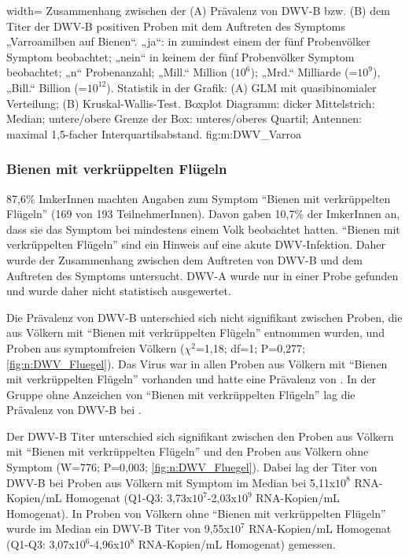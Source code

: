   {width=\textwidth} %
  {Zusammenhang zwischen der (A) Prävalenz von DWV-B bzw. (B) dem Titer der DWV-B positiven Proben mit dem Auftreten des Symptoms „Varroamilben auf Bienen“. „ja“: in zumindest einem der fünf Probenvölker Symptom beobachtet; „nein“ in keinem der fünf Probenvölker Symptom beobachtet; „n“ Probenanzahl; „Mill.“ Million ($10^6$); „Mrd.“ Milliarde (=$10^9$), „Bill.“ Billion (=$10^{12}$). Statistik in der Grafik: (A) GLM mit quasibinomialer Verteilung; (B) Kruskal-Wallis-Test. Boxplot Diagramm: dicker Mittelstrich: Median; untere/obere Grenze der Box: unteres/oberes Quartil; Antennen: maximal 1,5-facher Interquartilsabstand.} %
  {} %
  {fig:m:DWV_Varroa} %

\subsubsection{Bienen mit verkrüppelten Flügeln}

87,6\% ImkerInnen machten Angaben zum Symptom \enquote{Bienen mit verkrüppelten Flügeln} (169 von 193 TeilnehmerInnen). Davon gaben 10,7\% der ImkerInnen an, dass sie das Symptom bei mindestens einem Volk beobachtet hatten. \enquote{Bienen mit verkrüppelten Flügeln} sind ein Hinweis auf eine akute DWV-Infektion. Daher wurde der Zusammenhang zwischen dem Auftreten von DWV-B und dem Auftreten des Symptoms untersucht. DWV-A wurde nur in einer Probe gefunden und wurde daher nicht statistisch ausgewertet.

Die Prävalenz von DWV-B unterschied sich nicht signifikant zwischen Proben, die aus Völkern mit \enquote{Bienen mit verkrüppelten Flügeln} entnommen wurden, und Proben aus symptomfreien Völkern ($\chi^2$=1,18; df=1; P=0,277; \cref{fig:n:DWV_Fluegel}). Das Virus war in allen Proben aus Völkern mit \enquote{Bienen mit verkrüppelten Flügeln} vorhanden und hatte eine Prävalenz von . In der Gruppe ohne Anzeichen von \enquote{Bienen mit verkrüppelten Flügeln} lag die Prävalenz von DWV-B bei .

Der DWV-B Titer unterschied sich signifikant zwischen den Proben aus Völkern mit \enquote{Bienen mit verkrüppelten Flügeln} und den Proben aus Völkern ohne Symptom (W=776; P=0,003; \cref{fig:n:DWV_Fluegel}). Dabei lag der Titer von DWV-B bei Proben aus Völkern mit Symptom im Median bei 5,11x$10^8$ RNA-Kopien/\si{\milli\liter} Homogenat (Q1-Q3: 3,73x$10^7$-2,03x$10^9$ RNA-Kopien/\si{\milli\liter} Homogenat). In Proben von Völkern ohne \enquote{Bienen mit verkrüppelten Flügeln} wurde im Median ein DWV-B Titer von 9,55x$10^7$ RNA-Kopien/\si{\milli\liter} Homogenat (Q1-Q3: 3,07x$10^6$-4,96x$10^8$ RNA-Kopien/\si{\milli\liter} Homogenat) gemessen.

